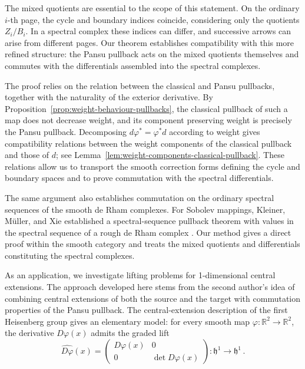 \documentclass[dvipsnames]{amsart}
\theoremstyle{definition}
\theoremstyle{definition}
\numberwithin{equation}{section}
\begin{document}
The mixed quotients are essential to the scope of this
statement. On the ordinary $i$-th page, the cycle and
boundary indices coincide, considering only the quotients $Z_i/B_i$. In a
spectral complex these indices can differ, and
successive arrows can arise from different pages. Our theorem
establishes compatibility with this more refined
structure: the Pansu pullback acts on the mixed
quotients themselves and commutes with the
differentials assembled into the spectral complexes.

The proof relies on the relation between the classical
and Pansu pullbacks, together with the naturality of
the exterior derivative. By
Proposition~\ref{prop:weight-behaviour-pullbacks},
the classical pullback of such a map does not decrease
weight, and its component preserving weight is
precisely the Pansu pullback. Decomposing
$d\varphi^*=\varphi^*d$ according to weight gives
compatibility relations between the weight components
of the classical pullback and those of $d$; see
Lemma~\ref{lem:weight-components-classical-pullback}.
These relations allow us to transport the smooth
correction forms defining the cycle and boundary
spaces and to prove commutation with the spectral
differentials.

The same argument also establishes commutation on
the ordinary spectral sequences of the smooth
de Rham complexes. For Sobolev mappings,
Kleiner, M\"uller, and Xie established a
spectral-sequence pullback theorem with values in
the spectral sequence of a rough de Rham complex
\cite{kleiner2022sobolev}.
Our method gives a direct proof within the smooth
category and treats the mixed quotients and
differentials constituting the spectral complexes.




As an application, we investigate lifting problems for
1-dimensional central extensions. The approach developed
here stems from the second author's idea of combining central
extensions of both the source and the target with commutation
properties of the Pansu pullback. The central-extension
description of the first Heisenberg group gives an elementary
model: for every smooth map
$\varphi:\mathbb R^2\to\mathbb R^2$, the derivative
$D\varphi(x)$ admits the graded lift
$$\widehat{D\varphi}(x)
    =
    \begin{pmatrix}
        D\varphi(x) & 0\\
        0 & \det D\varphi(x)
    \end{pmatrix}
    \colon\mathfrak h^1\longrightarrow\mathfrak h^1\,.$$
    
\end{document}
